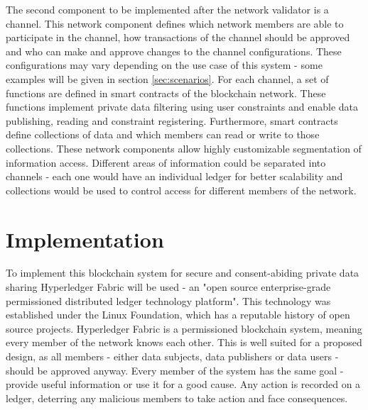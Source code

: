 \documentclass[12pt]{article}
\begin{document}
    The second component to be implemented after the network validator is a channel. This network component defines which network members are able to participate in the channel, how transactions of the channel should be approved and who can make and approve changes to the channel configurations. These configurations may vary depending on the use case of this system - some examples will be given in section \ref{sec:scenarios}. For each channel, a set of functions are defined in smart contracts of the blockchain network. These functions implement private data filtering using user constraints and enable data publishing, reading and constraint registering. Furthermore, smart contracts define collections of data and which members can read or write to those collections. These network components allow highly customizable segmentation of information access. Different areas of information could be separated into channels - each one would have an individual ledger for better scalability and collections would be used to control access for different members of the network.


    \section{Implementation}

    To implement this blockchain system for secure and consent-abiding private data sharing Hyperledger Fabric will be used - an "open source enterprise-grade permissioned distributed ledger technology platform"\cite{fabric}. This technology was established under the Linux Foundation, which has a reputable history of open source projects. Hyperledger Fabric is a permissioned blockchain system, meaning every member of the network knows each other. This is well suited for a proposed design, as all members - either data subjects, data publishers or data users - should be approved anyway. Every member of the system has the same goal - provide useful information or use it for a good cause. Any action is recorded on a ledger, deterring any malicious members to take action and face consequences.
\end{document}
